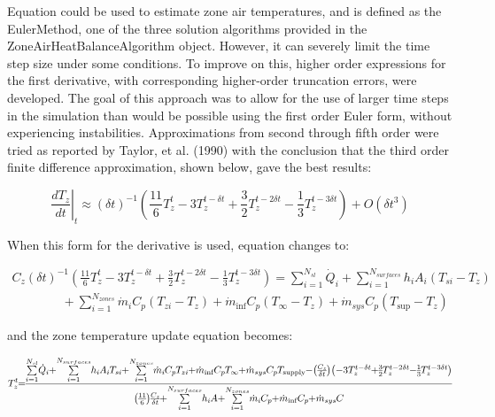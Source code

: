 Equation could be used to estimate zone air temperatures, and is defined as the EulerMethod, one of the three solution algorithms provided in the ZoneAirHeatBalanceAlgorithm object. However, it can severely limit the time step size under some conditions. To improve on this, higher order expressions for the first derivative, with corresponding higher-order truncation errors, were developed. The goal of this approach was to allow for the use of larger time steps in the simulation than would be possible using the first order Euler form, without experiencing instabilities. Approximations from second through fifth order were tried as reported by Taylor, et al. (1990) with the conclusion that the third order finite difference approximation, shown below, gave the best results:

\begin{equation}
{\left. {\frac{{d{T_z}}}{{dt}}} \right|_t} \approx {\left( {\delta t} \right)^{ - 1}}\left( {\frac{{11}}{6}T_z^t - 3T_z^{t - \delta t} + \frac{3}{2}T_z^{t - 2\delta t} - \frac{1}{3}T_z^{t - 3\delta t}} \right) + O\left( {\delta {t^3}} \right)
\end{equation}

When this form for the derivative is used, equation changes to:

\begin{equation}
\begin{array}{l}
{C_z}{\left( {\delta t} \right)^{ - 1}}\left( {\frac{{11}}{6}T_z^t - 3T_z^{t - \delta t} + \frac{3}{2}T_z^{t - 2\delta t} - \frac{1}{3}T_z^{t - 3\delta t}} \right) = \sum\limits_{i = 1}^{{N_{sl}}} {{{\dot Q}_i}}  + \sum\limits_{i = 1}^{{N_{surfaces}}} {{h_i}} {A_i}\left( {{T_{si}} - {T_z}} \right) \\
\quad \quad \quad \quad + \sum\limits_{i = 1}^{{N_{zones}}} {{{\dot m}_i}} {C_p}\left( {{T_{zi}} - {T_z}} \right) + {{\dot m}_{\inf }}{C_p}\left( {{T_\infty } - {T_z}} \right) + {{\dot m}_{sys}}{C_p}\left( {{T_{\sup }} - {T_z}} \right)
\end{array}
\end{equation}

and the zone temperature update equation becomes:

\begin{equation}
\medmuskip=0mu
\thinmuskip=0mu
\thickmuskip=0mu
\nulldelimiterspace=0pt
\scriptspace=0pt
T_z^t = \frac{{\sum\limits_{i = 1}^{{N_{sl}}} {{{\dot Q}_i}}  + \sum\limits_{i = 1}^{{N_{surfaces}}} {{h_i}} {A_i}{T_{si}} + \sum\limits_{i = 1}^{{N_{zones}}} {{{\dot m}_i}} {C_p}{T_{zi}}\, + {{\dot m}_{\inf }}{C_p}{T_\infty } + {{\dot m}_{sys}}{C_p}{T_{{\rm{supply}}}} - \left( {\frac{{{C_z}}}{{\delta t}}} \right)\left( { - 3T_z^{t - \delta t} + \frac{3}{2}T_z^{t - 2\delta t} - \frac{1}{3}T_z^{t - 3\delta t}} \right)}}{{\left( {\frac{{11}}{6}} \right)\frac{{{C_z}}}{{\delta t}} + \sum\limits_{i = 1}^{{N_{surfaces}}} {{h_i}} A + \sum\limits_{i = 1}^{{N_{zones}}} {{{\dot m}_i}} {C_p} + {{\dot m}_{\inf }}{C_p} + {{\dot m}_{sys}}C}}
\end{equation}

